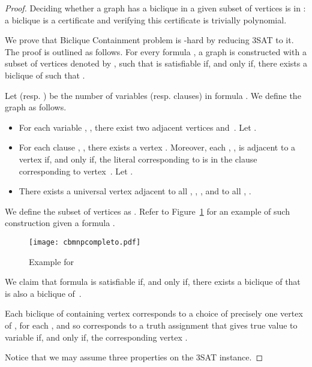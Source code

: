 \documentclass{article}
\begin{document}
\begin{proof}
Deciding whether a graph has a biclique in a given
subset of vertices is in : a biclique is a
certificate and verifying this certificate is trivially polynomial.

We prove that {\sc Biclique Containment} problem is -hard by
reducing {\sc 3SAT} to it. The proof is outlined as follows. For every formula
, a graph  is constructed with a subset of vertices denoted by
, such that  is satisfiable if, and only if, there exists a
biclique  of  such that .

	Let  (resp. ) be the number of variables (resp. clauses) in formula
	. We define the graph  as follows.
	
	\begin{itemize}
		\item For each variable , , there exist two adjacent
		vertices  and~. Let .
		\item For each clause , , there exists a vertex 
		. Moreover, each , , is adjacent to a vertex 
		if, and only if, the literal corresponding to  is in the clause
		corresponding to vertex~. Let .
		\item There exists a universal vertex  adjacent to all ,
		, , and to all , .
		
	\end{itemize}
	
	We define the subset of vertices  as . Refer to 
	Figure~\ref{fig:cbmnpcompleto} for an example of such construction given a
	formula .

\begin{figure}[h]
\center
	\texttt{[image: cbmnpcompleto.pdf]}
	\caption{Example for  }
	\label{fig:cbmnpcompleto}
\end{figure}
	
	We claim that formula  is satisfiable if, and only if, there exists a
	biclique of  that is also a biclique of~.
	
	Each biclique  of  containing vertex  corresponds to a
	choice of precisely one vertex of , for each , and so  corresponds to a truth assignment  that gives
	true value to variable  if, and only if, the corresponding vertex .
	
	Notice that we may assume three properties on the {\sc 3SAT} instance.
	

\end{proof}
\end{document}
